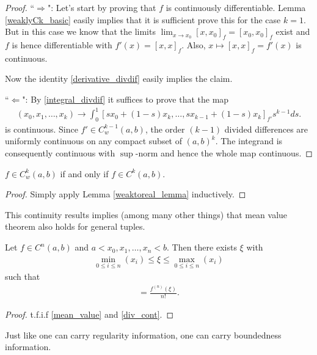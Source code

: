 \begin{proof}
	``$\Rightarrow$": Let's start by proving that $f$ is continuously differentiable. Lemma \ref{weaklyCk_basic} easily implies that it is sufficient prove this for the case $k = 1$. But in this case we know that the limits $\lim_{x \to x_{0}} [x, x_{0}]_{f} = [x_{0}, x_{0}]_{f}$ exist and $f$ is hence differentiable with $f'(x) = [x, x]_{f}$. Also, $x \mapsto [x, x]_{f} = f'(x)$ is continuous.

	Now the identity \ref{derivative_divdif} easily implies the claim.

	``$\Leftarrow$": By \ref{integral_divdif} it suffices to prove that the map
	\begin{align*}
		(x_{0}, x_{1}, \ldots, x_{k}) \to \int_{0}^{1}[s x_{0} + (1 - s) x_{k}, \ldots, s x_{k - 1} + (1 - s) x_{k}]_{f'} s^{k - 1} d s.
	\end{align*}
	is continuous. Since $f' \in C_{w}^{k - 1}(a, b)$, the order $(k - 1)$ divided differences are uniformly continuous on any compact subset of $(a, b)^{k}$. The integrand is consequently continuous with $\sup$-norm and hence the whole map continuous.
\end{proof}

\begin{kor}\label{div_cont}
	$f \in C_{w}^{k}(a, b)$ if and only if $f \in C^{k}(a, b)$.
\end{kor}
\begin{proof}
	Simply apply Lemma \ref{weaktoreal_lemma} inductively.
\end{proof}

This continuity results implies (among many other things) that mean value theorem also holds for general tuples.
\begin{kor}
	Let $f \in C^{n}(a, b)$ and $a < x_{0}, x_{1}, \ldots, x_{n} < b$. Then there exists $\xi$ with
	\begin{align*}
		\min_{0 \leq i \leq n}(x_{i}) \leq \xi \leq \max_{0 \leq i \leq n}(x_{i})
	\end{align*}
	such that
	\begin{align}
		[x_{0}, x_{1}, \ldots, x_{n}] = \frac{f^{(n)}(\xi)}{n!}.
	\end{align}
\end{kor}
\begin{proof}
	t.f.i.f \ref{mean_value} and \ref{div_cont}.
\end{proof}

Just like one can carry regularity information, one can carry boundedness information.


